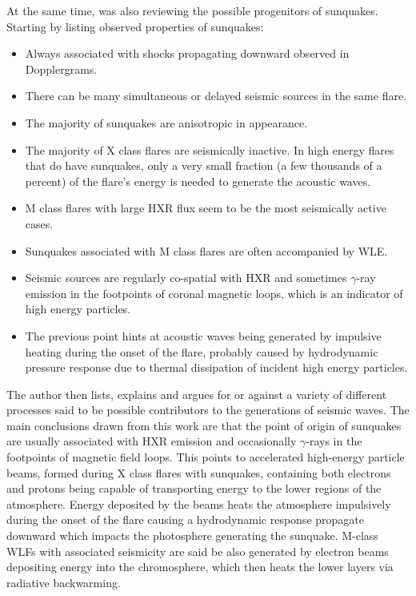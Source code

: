 At the same time, \cite{2008SoPh..251..641Z} was also reviewing the possible progenitors of sunquakes. Starting by listing observed properties of sunquakes:
\begin{itemize}
\item Always associated with shocks propagating downward observed in Dopplergrams.
\item There can be many simultaneous or delayed seismic sources in the same flare.
\item The majority of sunquakes are anisotropic in appearance.
\item The majority of X class flares are seismically inactive. In high energy flares that do have sunquakes, only a very small fraction (a few thousands of a percent) of the flare's energy is needed to generate the acoustic waves. 
\item M class flares with large HXR flux seem to be the most seismically active cases.
\item Sunquakes associated with M class flares are often accompanied by WLE.
\item Seismic sources are regularly co-spatial with HXR and sometimes $\gamma$-ray emission in the footpoints of coronal magnetic loops, which is an indicator of high energy particles.
\item The previous point hints at acoustic waves being generated by impulsive heating during the onset of the flare, probably caused by hydrodynamic pressure response due to thermal dissipation of incident high energy particles.
\end{itemize}
The author then lists, explains and argues for or against a variety of different processes said to be possible contributors to the generations of seismic waves. The main conclusions drawn from this work are that the point of origin of sunquakes are usually associated with HXR emission and occasionally $\gamma$-rays in the footpoints of magnetic field loops. This points to accelerated high-energy particle beams, formed during X class flares with sunquakes, containing both electrons and protons being capable of transporting energy to the lower regions of the atmosphere. Energy deposited by the beams heats the atmosphere impulsively during the onset of the flare causing a hydrodynamic response propagate downward which impacts the photosphere generating the sunquake. M-class WLFs with associated seismicity are said be also generated by electron beams depositing energy into the chromosphere, which then heats the lower layers via radiative backwarming.\\


